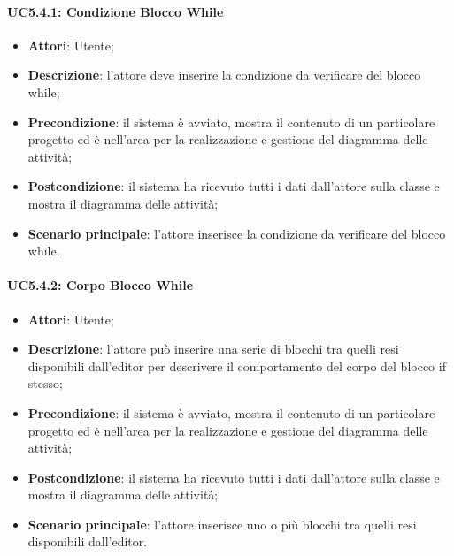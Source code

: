 \paragraph{UC5.4.1: Condizione Blocco While}
\label{UC5.4.1}
\begin{itemize}
	\item \textbf{Attori}: Utente;
	\item \textbf{Descrizione}: l'attore deve inserire la condizione da verificare del blocco while;
	\item \textbf{Precondizione}: il sistema è avviato, mostra il contenuto di un particolare progetto ed è nell'area per la realizzazione e gestione del diagramma delle attività;
	\item \textbf{Postcondizione}: il sistema ha ricevuto tutti i dati dall'attore sulla classe e mostra il diagramma delle attività;
	\item \textbf{Scenario principale}: l'attore inserisce la condizione da verificare del blocco while.
\end{itemize}

\paragraph{UC5.4.2: Corpo Blocco While}
\label{UC5.4.2}
\begin{itemize}
	\item \textbf{Attori}: Utente;
	\item \textbf{Descrizione}: l'attore può inserire una serie di blocchi tra quelli resi disponibili dall'editor per descrivere il comportamento del corpo del blocco if stesso;
	\item \textbf{Precondizione}: il sistema è avviato, mostra il contenuto di un particolare progetto ed è nell'area per la realizzazione e gestione del diagramma delle attività;
	\item \textbf{Postcondizione}: il sistema ha ricevuto tutti i dati dall'attore sulla classe e mostra il diagramma delle attività;
	\item \textbf{Scenario principale}: l'attore inserisce uno o più blocchi tra quelli resi disponibili dall'editor.
\end{itemize}

